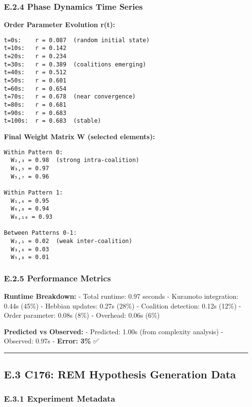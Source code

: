 \documentclass[
]{article}
\begin{document}
\subsubsection{E.2.4 Phase Dynamics Time
Series}\label{e.2.4-phase-dynamics-time-series}

\textbf{Order Parameter Evolution r(t):}

\begin{verbatim}
t=0s:    r = 0.087  (random initial state)
t=10s:   r = 0.142
t=20s:   r = 0.234
t=30s:   r = 0.389  (coalitions emerging)
t=40s:   r = 0.512
t=50s:   r = 0.601
t=60s:   r = 0.654
t=70s:   r = 0.678  (near convergence)
t=80s:   r = 0.681
t=90s:   r = 0.683
t=100s:  r = 0.683  (stable)
\end{verbatim}

\textbf{Final Weight Matrix W (selected elements):}

\begin{verbatim}
Within Pattern 0:
  W₂,₃ = 0.98  (strong intra-coalition)
  W₃,₅ = 0.97
  W₅,₇ = 0.96

Within Pattern 1:
  W₁,₆ = 0.95
  W₆,₈ = 0.94
  W₈,₁₀ = 0.93

Between Patterns 0-1:
  W₂,₁ = 0.02  (weak inter-coalition)
  W₃,₆ = 0.03
  W₅,₈ = 0.01
\end{verbatim}

\subsubsection{E.2.5 Performance
Metrics}\label{e.2.5-performance-metrics}

\textbf{Runtime Breakdown:} - Total runtime: 0.97 seconds - Kuramoto
integration: 0.44s (45\%) - Hebbian updates: 0.27s (28\%) - Coalition
detection: 0.12s (12\%) - Order parameter: 0.08s (8\%) - Overhead: 0.06s
(6\%)

\textbf{Predicted vs Observed:} - Predicted: 1.00s (from complexity
analysis) - Observed: 0.97s - \textbf{Error: 3\%} ✅

\begin{center}\rule{0.5\linewidth}{0.5pt}\end{center}

\subsection{E.3 C176: REM Hypothesis Generation
Data}\label{e.3-c176-rem-hypothesis-generation-data}

\subsubsection{E.3.1 Experiment
Metadata}\label{e.3.1-experiment-metadata}
\end{document}
